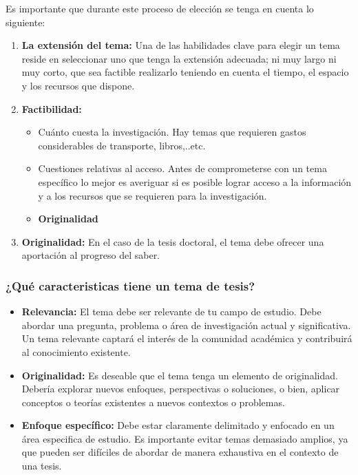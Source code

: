 \documentclass[
	11pt, %
]{beamer}
\begin{document}
\begin{frame}
  Es importante que durante este proceso de elección se tenga en cuenta lo siguiente:
  \bigskip %
  \begin{enumerate}
  \item \textbf{La extensión del tema:} Una de las habilidades clave para elegir un tema reside en seleccionar uno que tenga la extensión adecuada; ni muy largo ni muy corto, que sea factible realizarlo teniendo en cuenta el tiempo, el espacio y los recursos que dispone.
  \item \textbf{Factibilidad:}
    \begin{itemize}
    \item Cuánto cuesta la investigación. Hay temas que requieren gastos considerables de transporte, libros,..etc.
    \item Cuestiones relativas al acceso. Antes de comprometerse con un tema específico lo mejor es averiguar si es posible lograr acceso a la información y a los recursos que se requieren para la investigación.
    \item \textbf{Originalidad}
    \end{itemize}
  \item \textbf{Originalidad:} En el caso de la tesis doctoral, el tema debe ofrecer una aportación al progreso del saber.
  \end{enumerate}
  
\end{frame}

\begin{frame}
  \frametitle{¿Qué caracteristicas tiene un tema de tesis?}
  \bigskip %
  
  \begin{itemize}
  \item \textbf{Relevancia:} El tema debe ser relevante de tu campo de estudio. Debe abordar una pregunta, problema o área de investigación actual y significativa. Un tema relevante captará el interés de la comunidad académica y contribuirá al conocimiento existente.
  \item \textbf{Originalidad:} Es deseable que el tema tenga un elemento de originalidad. Debería explorar nuevos enfoques, perspectivas o soluciones, o bien, aplicar conceptos o teorías existentes a nuevos contextos o problemas.
  \item \textbf{Enfoque específico:} Debe estar claramente delimitado y enfocado en un área especifica de estudio. Es importante evitar temas demasiado amplios, ya que pueden ser difíciles de abordar de manera exhaustiva en el contexto de una tesis.
  \end{itemize}
\end{frame}
\end{document}
